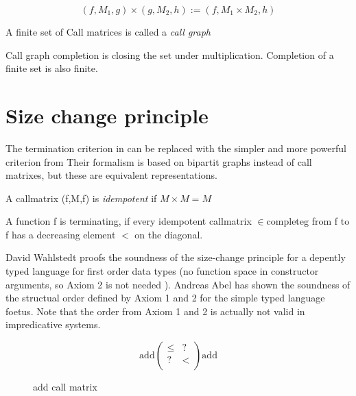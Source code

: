 \begin{definition}

\[(f,M_1,g) \times (g,M_2,h) := (f,M_1 \times M_2,h)\]
\end{definition}

\begin{definition}
A finite set of Call matrices is called a \emph{call graph}
\end{definition}

\begin{definition}
Call graph completion is closing the set under multiplication.
Completion of a finite set is also finite. 
\end{definition}

\section{Size change principle}

The termination criterion in \cite{abelAltenkirch:predStRec} can be replaced with the
simpler and more powerful criterion from \cite{lee01sizechange}
Their formalism is based on bipartit graphs instead of call matrixes, but these are
equivalent representations.

\begin{definition}
A callmatrix (f,M,f) is \emph{idempotent} if $ M \times M = M $ 
\end{definition}

\begin{definition}
A function f is terminating, if every idempotent callmatrix  $ \in \mathrm{complete g} $ from f to f has a decreasing element $<$ on
the diagonal.
\end{definition}

David Wahlstedt proofs the soundness of the size-change principle for a depently typed language 
for first order data types (no function space in constructor arguments, so Axiom 2 is not needed ).
Andreas Abel has shown the soundness of the structual order defined by Axiom 1 and 2 for the simple typed
language foetus.
Note that the order from Axiom 1 and 2 is actually not valid in impredicative systems.

\begin{figure}[p]
\[
\mathrm{add}\begin{pmatrix}

\leq & ? \\
?    & < \\

\end{pmatrix}\mathrm{add}
\]
\caption{add call matrix}
\end{figure}

